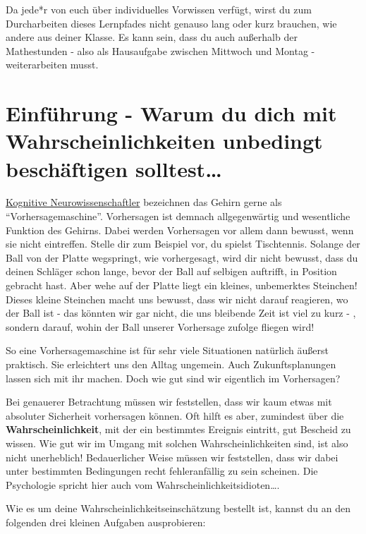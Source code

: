 \documentclass[
  ngerman,
]{book}
\begin{document}
Da jede*r von euch über individuelles Vorwissen verfügt, wirst du zum Durcharbeiten dieses Lernpfades nicht genauso lang oder kurz brauchen, wie andere aus deiner Klasse. Es kann sein, dass du auch außerhalb der Mathestunden - also als Hausaufgabe zwischen Mittwoch und Montag - weiterarbeiten musst.

\hypertarget{einfuxfchrung---warum-du-dich-mit-wahrscheinlichkeiten-unbedingt-beschuxe4ftigen-solltest}{%
\chapter{Einführung - Warum du dich mit Wahrscheinlichkeiten unbedingt beschäftigen solltest\ldots{}}\label{einfuxfchrung---warum-du-dich-mit-wahrscheinlichkeiten-unbedingt-beschuxe4ftigen-solltest}}

\href{\%22https://de.wikipedia.org/wiki/Kognitive_Neurowissenschaft\%22}{Kognitive Neurowissenschaftler} bezeichnen das Gehirn gerne als ``Vorhersagemaschine''. Vorhersagen ist demnach allgegenwärtig und wesentliche Funktion des Gehirns. Dabei werden Vorhersagen vor allem dann bewusst, wenn sie nicht eintreffen. Stelle dir zum Beispiel vor, du spielst Tischtennis. Solange der Ball von der Platte wegspringt, wie vorhergesagt, wird dir nicht bewusst, dass du deinen Schläger schon lange, bevor der Ball auf selbigen auftrifft, in Position gebracht hast. Aber wehe auf der Platte liegt ein kleines, unbemerktes Steinchen! Dieses kleine Steinchen macht uns bewusst, dass wir nicht darauf reagieren, wo der Ball ist - das könnten wir gar nicht, die uns bleibende Zeit ist viel zu kurz - , sondern darauf, wohin der Ball unserer Vorhersage zufolge fliegen wird!

So eine Vorhersagemaschine ist für sehr viele Situationen natürlich äußerst praktisch. Sie erleichtert uns den Alltag ungemein. Auch Zukunftsplanungen lassen sich mit ihr machen. Doch wie gut sind wir eigentlich im Vorhersagen?

Bei genauerer Betrachtung müssen wir feststellen, dass wir kaum etwas mit absoluter Sicherheit vorhersagen können. Oft hilft es aber, zumindest über die \textbf{Wahrscheinlichkeit}, mit der ein bestimmtes Ereignis eintritt, gut Bescheid zu wissen. Wie gut wir im Umgang mit solchen Wahrscheinlichkeiten sind, ist also nicht unerheblich! Bedauerlicher Weise müssen wir feststellen, dass wir dabei unter bestimmten Bedingungen recht fehleranfällig zu sein scheinen. Die Psychologie spricht hier auch vom Wahrscheinlichkeitsidioten\ldots.

Wie es um deine Wahrscheinlichkeitseinschätzung bestellt ist, kannst du an den folgenden drei kleinen Aufgaben ausprobieren:
\end{document}
